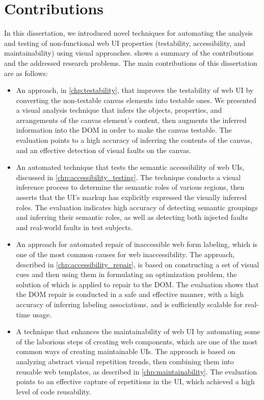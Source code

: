 \section{Contributions}
In this dissertation, we introduced novel techniques for automating 
the analysis and testing of non-functional web UI properties (testability, accessibility, and maintainability) using visual 
approaches. 
 shows a summary of the contributions and the addressed research problems. 
The main contributions of this dissertation are as follows:
\begin{itemize}
	\item An approach, in \autoref{chp:testability}, that improves the testability 
	of web UI by converting the non-testable canvas elements into testable ones. 
	We presented a visual analysis technique that infers the objects, properties, 
	and arrangements of the canvas element's content, then augments the inferred 
	information into the DOM in order to make the canvas testable. 
	The evaluation points to a high accuracy of inferring the contents of the 
	canvas, and an effective detection of visual faults on the canvas. 
	
	\item An automated technique that tests the semantic accessibility of web UIs, 
	discussed in \autoref{chp:accessibility_testing}. The technique conducts 
	a visual inference process to determine the semantic roles of various regions, 
	then asserts that the UI's markup has explicitly expressed the visually inferred 
	roles. The evaluation indicates high accuracy of detecting semantic groupings 
	and inferring their semantic roles, as well as detecting both injected faults and 
	real-world faults in test subjects. 
	
	\item An approach for automated repair of inaccessible web form labeling,  which is 
	one of the most common causes for web inaccessibility. The approach, described in \autoref{chp:accessibility_repair}, is based on constructing a set of visual cues 
	and then using them in formulating an optimization problem, the solution of which is 
	applied to repair to the DOM. The evaluation shows that the DOM repair is conducted 
	in a safe and effective manner, with a high accuracy of inferring labeling associations, 
	and is sufficiently scalable for real-time usage.
	
	\item A technique that enhances the maintainability of web UI by automating 
	some of the laborious steps of creating web components, which are one of the most common ways of creating maintainable UIs. The approach 
	is based on analyzing abstract visual repetition trends, then combining them into reusable 
	web templates, as described in \autoref{chp:maintainability}. The evaluation points to 
	an effective capture of repetitions in the UI, which achieved a high level of code reusability.
	

\end{itemize}
